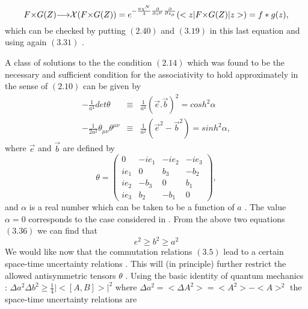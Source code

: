 \documentclass[a4paper,12pt]{article}
\begin{document}
\begin{equation}
F{\times}G(Z){\longrightarrow}{\cal
X}(F{\times}G(Z))=e^{-\frac{a{\chi}^N}{4}{\frac{\partial}{{\partial}z^{\mu}}}{\frac{\partial}{{\partial}z_{\mu}}}}(<z|F{\times}G(Z)|z>)=f*g(z),
\end{equation}
which can be checked by putting  $(2.40)$ and $(3.19)$ in this
last equation and using again $(3.31)$ .

\vskip 5mm \vskip 5mm
\noindent

A class of solutions to the the condition $(2.14)$ which was
found to be the necessary and sufficient condition for the
associativity to hold approximately in the sense of $(2.10)$ can
be given by
\begin{eqnarray}
-\frac{1}{a^4}det{\theta} &\equiv &\frac{1}{a^4}(\vec{e}.\vec{b})^2=cosh^2{\alpha}\nonumber\\
-\frac{1}{2a^2}{\theta}_{{\mu}{\nu}}{\theta}^{{\mu}{\nu}}&\equiv&\frac{1}{a^2}({\vec{e}}^2
-{\vec{b}}^2)=sinh^2{\alpha} ,
\end{eqnarray}
where $\vec{e}$ and $\vec{b}$ are defined by
\begin{equation}
\theta=\left( \begin{array}{cccc}
                                     0  & -ie_1 &-ie_2&-ie_3\\
                                     ie_1  & 0 &b_3&-b_2\\
                                     ie_2  &-b_3 &0&b_1\\
                                     ie_3 &b_2&-b_1&0
\end{array}\right),
\end{equation}
and ${\alpha}$ is a real number which can be taken to be a
function of $a$  . The value ${\alpha}=0$ corresponds to the case
considered in \cite{dop} . From the above two equations $(3.36)$
we can find that
\begin{equation}
e^2{\geq}b^2{\geq}a^2
\end{equation}
We would like now that the commutation relations $(3.5)$ lead to a
certain space-time uncertainty relations . This will (in
principle) further restrict the allowed antisymmetric tensors
${\theta}$ .  Using the basic identity of quantum mechanics  :
${\Delta}a^2 {\Delta}b^2{\geq}\frac{1}{4}|<[A,B]>|^2 $ where
${\Delta}a^2=<{\Delta}A^2>=<A^2> - <A>^2$ the space-time
uncertainty relations are
\end{document}
